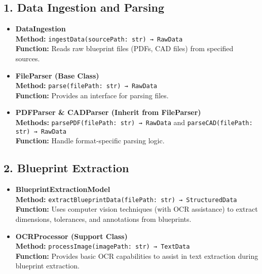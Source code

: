 \documentclass{article}
\begin{document}
\subsection{1. Data Ingestion and Parsing}
\begin{itemize}
    \item \textbf{DataIngestion} \\
    \textbf{Method:} \verb|ingestData(sourcePath: str) → RawData| \\
    \textbf{Function:} Reads raw blueprint files (PDFs, CAD files) from specified sources.
    
    \item \textbf{FileParser (Base Class)} \\
    \textbf{Method:} \verb|parse(filePath: str) → RawData| \\
    \textbf{Function:} Provides an interface for parsing files.
    
    \item \textbf{PDFParser \& CADParser (Inherit from FileParser)} \\
    \textbf{Methods:} \verb|parsePDF(filePath: str) → RawData| and \verb|parseCAD(filePath: str) → RawData| \\
    \textbf{Function:} Handle format-specific parsing logic.
\end{itemize}

\subsection{2. Blueprint Extraction}
\begin{itemize}
    \item \textbf{BlueprintExtractionModel} \\
    \textbf{Method:} \verb|extractBlueprintData(filePath: str) → StructuredData| \\
    \textbf{Function:} Uses computer vision techniques (with OCR assistance) to extract dimensions, tolerances, and annotations from blueprints.
    
    \item \textbf{OCRProcessor (Support Class)} \\
    \textbf{Method:} \verb|processImage(imagePath: str) → TextData| \\
    \textbf{Function:} Provides basic OCR capabilities to assist in text extraction during blueprint extraction.
\end{itemize}
\end{document}
